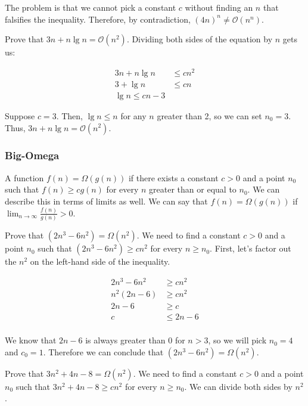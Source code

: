 The problem is that we cannot pick a constant $c$ without finding an $n$ that falsifies the inequality. Therefore, by contradiction, $(4n)^n \neq \mathcal{O}(n^n)$.

\example Prove that $3n + n\lg{n} = \mathcal{O}(n^2)$. Dividing both sides of the equation by $n$ gets us:

\begin{align*}
  3n + n\lg{n} &\leq cn^2\\
  3 + \lg{n} &\leq cn\\
  \lg{n} \leq cn - 3
\end{align*}

Suppose $c = 3$. Then, $\lg{n} \leq n$ for any $n$ greater than 2, so we can set $n_0 = 3$. Thus, $3n + n\lg{n} = \mathcal{O}(n^2)$.

\subsubsection*{Big-Omega}
A function $f(n) = \Omega(g(n))$ if there exists a constant $c > 0$ and a point $n_0$ such that $f(n) \geq cg(n)$ for every $n$ greater than or equal to $n_0$. We can describe this in terms of limits as well. We can say that $f(n) = \Omega(g(n))$ if $\lim_{n \to \infty} \frac{f(n)}{g(n)} > 0$.

\noindent{}

\example Prove that $(2n^3 - 6n^2) = \Omega(n^2)$. We need to find a constant $c > 0$ and a point $n_0$ such that $(2n^3 - 6n^2) \geq cn^2$ for every $n \geq n_0$. First, let's factor out the $n^2$ on the left-hand side of the inequality.

\begin{align*}
  2n^3 - 6n^2 &\geq cn^2\\
  n^2(2n - 6) &\geq cn^2\\
  2n - 6 &\geq c\\
  c &\leq 2n - 6\\
\end{align*}

We know that $2n - 6$ is always greater than $0$ for $n > 3$, so we will pick $n_0 = 4$ and $c_0 = 1$. Therefore we can conclude that $(2n^3 - 6n^2) = \Omega(n^2)$.

\example Prove that $3n^2 + 4n - 8 = \Omega(n^2)$. We need to find a constant $c > 0$ and a point $n_0$ such that $3n^2 + 4n - 8 \geq cn^2$ for every $n \geq n_0$. We can divide both sides by $n^2$.

